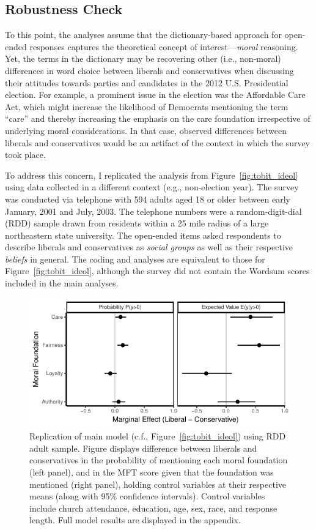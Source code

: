 \documentclass[12pt]{article}
\begin{document}
\subsection*{Robustness Check}






To this point, the analyses assume that the dictionary-based approach for open-ended responses captures the theoretical concept of interest---\textit{moral} reasoning. Yet, the terms in the dictionary may be recovering other (i.e., non-moral) differences in word choice between liberals and conservatives when discussing their attitudes towards parties and candidates in the 2012 U.S. Presidential election. For example, a prominent issue in the election was the Affordable Care Act, which might increase the likelihood of Democrats mentioning the term ``care'' and thereby increasing the emphasis on the care foundation irrespective of underlying moral considerations. In that case, observed differences between liberals and conservatives would be an artifact of the context in which the survey took place.

To address this concern, I replicated the analysis from Figure~\ref{fig:tobit_ideol} using data collected in a different context (e.g., non-election year). The survey was conducted via telephone with 594 adults aged 18 or older between early January, 2001 and July, 2003. The telephone numbers were a random-digit-dial (RDD) sample drawn from residents within a 25 mile radius of a large northeastern state university. The open-ended items asked respondents to describe liberals and conservatives as \textit{social groups} as well as their respective \textit{beliefs} in general. The coding and analyses are equivalent to those for Figure~\ref{fig:tobit_ideol}, although the survey did not contain the Wordsum scores included in the main analyses.

\begin{figure}[ht]\centering
\includegraphics{../calc/fig/tobit_ideol_lisurvey.pdf}
\caption{Replication of main model (c.f., Figure~\ref{fig:tobit_ideol}) using RDD adult sample. Figure displays difference between liberals and conservatives in the probability of mentioning each moral foundation (left panel), and in the MFT score given that the foundation was mentioned (right panel), holding control variables at their respective means (along with 95\% confidence intervals). Control variables include church attendance, education, age, sex, race, and response length. Full model results are displayed in the appendix.
}\label{fig:tobit_ideol_lisurvey}
\end{figure}
\end{document}

